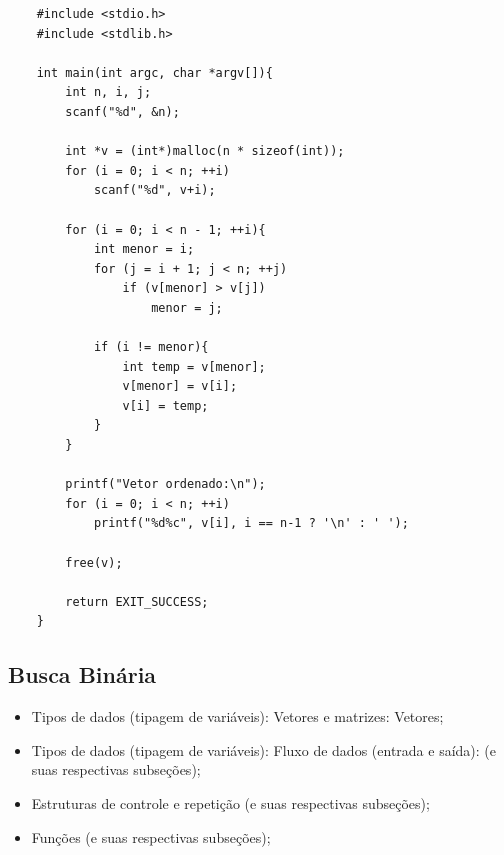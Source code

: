 \documentclass[12pt]{article}
\begin{document}
\hspace{0.25cm}
\begin{lstlisting}
    #include <stdio.h>
    #include <stdlib.h>
        
    int main(int argc, char *argv[]){
        int n, i, j;
        scanf("%d", &n);
            
        int *v = (int*)malloc(n * sizeof(int));
        for (i = 0; i < n; ++i)
    		scanf("%d", v+i);
    
        for (i = 0; i < n - 1; ++i){
    		int menor = i;
    		for (j = i + 1; j < n; ++j)
    			if (v[menor] > v[j])
    				menor = j;
    		
    		if (i != menor){
    			int temp = v[menor];
    			v[menor] = v[i];
    			v[i] = temp;
    		}
    	}
    	
        printf("Vetor ordenado:\n");
        for (i = 0; i < n; ++i)
            printf("%d%c", v[i], i == n-1 ? '\n' : ' ');
            
    	free(v);
    	
        return EXIT_SUCCESS;
    }
\end{lstlisting}

\newpage
\subsection{Busca Binária}

\hspace{0.25cm}
\begin{tcolorbox}[colback=violet!5!white,colframe=violet!75!white,title=Capítulos recomendados:]
    \begin{itemize}
        \item Tipos de dados (tipagem de variáveis): Vetores e matrizes: Vetores;
        \item Tipos de dados (tipagem de variáveis): Fluxo de dados (entrada e saída): (e suas respectivas subseções);
        \item Estruturas de controle e repetição (e suas respectivas subseções);
        \item Funções (e suas respectivas subseções);
    \end{itemize}
\end{tcolorbox}
\end{document}
